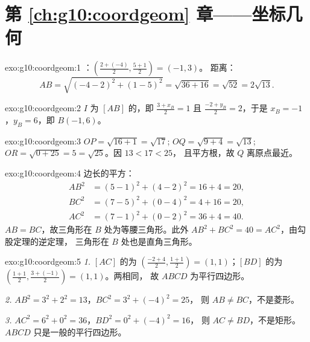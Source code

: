 \section*{第 \ref{ch:g10:coordgeom} 章——坐标几何}

\begin{solution}{exo:g10:coordgeom:1}
：$\left(\frac{2 + (-4)}{2}, \frac{5 + 1}{2}\right) = (-1, 3)$。
距离：
\[
AB = \sqrt{(-4 - 2)^2 + (1 - 5)^2} = \sqrt{36 + 16} = \sqrt{52}
= 2\sqrt{13}.
\]
\end{solution}

\begin{solution}{exo:g10:coordgeom:2}
$I$ 为 $[AB]$ 的，即 $\frac{3 + x_B}{2} = 1$ 且
$\frac{-2 + y_B}{2} = 2$，于是 $x_B = -1$，$y_B = 6$，即 $B(-1, 6)$。
\end{solution}

\begin{solution}{exo:g10:coordgeom:3}
$OP = \sqrt{16 + 1} = \sqrt{17}$; $OQ = \sqrt{9 + 4} = \sqrt{13}$;
$OR = \sqrt{0 + 25} = 5 = \sqrt{25}$。因 $13 < 17 < 25$，
且平方根，故 $Q$ 离原点最近。
\end{solution}

\begin{solution}{exo:g10:coordgeom:4}
边长的平方：
\begin{align*}
AB^2 &= (5-1)^2 + (4-2)^2 = 16 + 4 = 20, \\
BC^2 &= (7-5)^2 + (0-4)^2 = 4 + 16 = 20, \\
AC^2 &= (7-1)^2 + (0-2)^2 = 36 + 4 = 40 .
\end{align*}
$AB = BC$，故三角形在 $B$ 处为等腰三角形。此外
$AB^2 + BC^2 = 40 = AC^2$，由勾股定理的逆定理，
三角形在 $B$ 处也是直角三角形。
\end{solution}

\begin{solution}{exo:g10:coordgeom:5}
\emph{1.} $[AC]$ 的为
$\left(\frac{-2+4}{2}, \frac{1+1}{2}\right) = (1, 1)$；$[BD]$ 的为
$\left(\frac{1+1}{2}, \frac{3+(-1)}{2}\right) = (1, 1)$。两相同，
故 $ABCD$ 为平行四边形。

\emph{2.} $AB^2 = 3^2 + 2^2 = 13$，$BC^2 = 3^2 + (-4)^2 = 25$，
则 $AB \neq BC$，不是菱形。

\emph{3.} $AC^2 = 6^2 + 0^2 = 36$，$BD^2 = 0^2 + (-4)^2 = 16$，
则 $AC \neq BD$，不是矩形。$ABCD$ 只是一般的平行四边形。
\end{solution}

